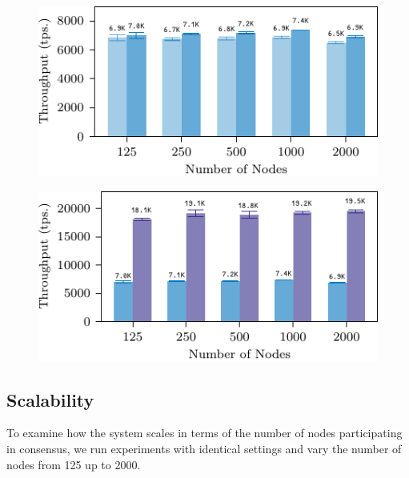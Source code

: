 \begin{figure}[h]
\includegraphics[width=\linewidth]{figures/thr-ava.pdf}
\label{fig:eval-thr}
\end{figure}

\begin{figure}
\includegraphics[width=\linewidth]{figures/thr-raw.pdf}
\label{fig:eval-thr-raw}
\end{figure}

\subsection{Scalability}%

To examine how the system scales in terms of the number of nodes
participating in {\sysname} consensus, we run experiments with identical settings
and vary the number of nodes from 125 up to 2000.

